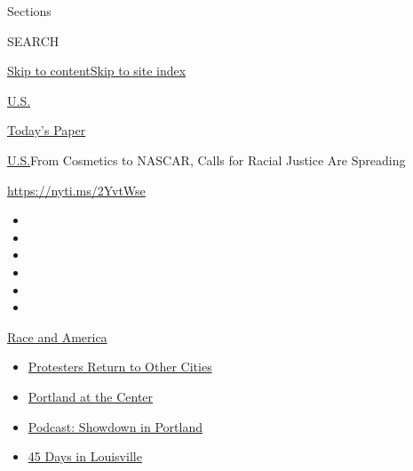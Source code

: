 Sections

SEARCH

\protect\hyperlink{site-content}{Skip to
content}\protect\hyperlink{site-index}{Skip to site index}

\href{https://www.nytimes.com/section/us}{U.S.}

\href{https://myaccount.nytimes.com/auth/login?response_type=cookie\&client_id=vi}{}

\href{https://www.nytimes.com/section/todayspaper}{Today's Paper}

\href{/section/us}{U.S.}\textbar{}From Cosmetics to NASCAR, Calls for
Racial Justice Are Spreading

\url{https://nyti.ms/2YvtWse}

\begin{itemize}
\item
\item
\item
\item
\item
\item
\end{itemize}

\href{https://www.nytimes.com/news-event/george-floyd-protests-minneapolis-new-york-los-angeles?action=click\&pgtype=Article\&state=default\&region=TOP_BANNER\&context=storylines_menu}{Race
and America}

\begin{itemize}
\tightlist
\item
  \href{https://www.nytimes.com/2020/07/26/us/protests-portland-seattle-trump.html?action=click\&pgtype=Article\&state=default\&region=TOP_BANNER\&context=storylines_menu}{Protesters
  Return to Other Cities}
\item
  \href{https://www.nytimes.com/2020/07/24/us/portland-oregon-protests-white-race.html?action=click\&pgtype=Article\&state=default\&region=TOP_BANNER\&context=storylines_menu}{Portland
  at the Center}
\item
  \href{https://www.nytimes.com/2020/07/23/podcasts/the-daily/portland-protests.html?action=click\&pgtype=Article\&state=default\&region=TOP_BANNER\&context=storylines_menu}{Podcast:
  Showdown in Portland}
\item
  \href{https://www.nytimes.com/interactive/2020/07/16/us/black-lives-matter-protests-louisville-breonna-taylor.html?action=click\&pgtype=Article\&state=default\&region=TOP_BANNER\&context=storylines_menu}{45
  Days in Louisville}
\end{itemize}

